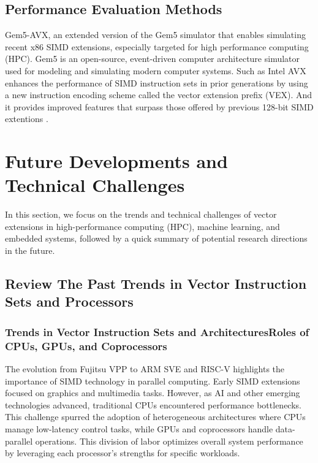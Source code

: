 \documentclass[conference]{IEEEtran}
\begin{document}
\subsection{Performance Evaluation Methods}

Gem5-AVX, an extended version of the Gem5 simulator that enables simulating recent x86 SIMD extensions, especially targeted for high performance computing (HPC). Gem5 is an open-source, event-driven computer architecture simulator used for modeling and simulating modern computer systems. Such as Intel AVX enhances the performance of SIMD instruction sets in prior generations by using a new instruction encoding scheme called the vector extension prefix (VEX). And it provides improved features that surpass those offered by previous 128-bit SIMD extentions \cite{b20}.



\section{Future Developments and Technical Challenges}
In this section, we focus on the trends and technical challenges of vector extensions in high-performance computing (HPC), machine learning, and embedded systems, followed by a quick summary of potential research directions in the future.
\subsection{Review The Past Trends in Vector Instruction Sets and Processors}
\subsubsection{Trends in Vector Instruction Sets and ArchitecturesRoles of CPUs, GPUs, and Coprocessors \cite{b17}\cite{b21}}
The evolution from Fujitsu VPP to ARM SVE and RISC-V highlights the importance of SIMD technology in parallel computing. Early SIMD extensions focused on graphics and multimedia tasks. However, as AI and other emerging technologies advanced, traditional CPUs encountered performance bottlenecks. This challenge spurred the adoption of heterogeneous architectures where CPUs manage low-latency control tasks, while GPUs and coprocessors handle data-parallel operations. This division of labor optimizes overall system performance by leveraging each processor's strengths for specific workloads.
\end{document}
